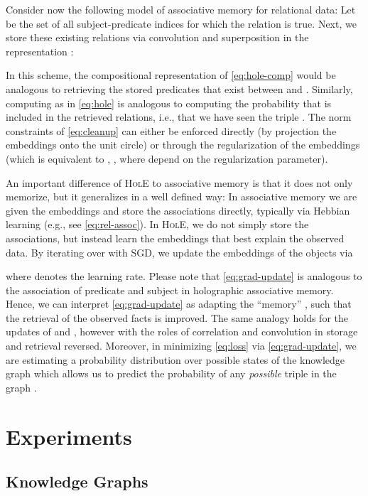 \documentclass[letterpaper]{article}
\newcommand{\hole}{\textsc{HolE}\xspace}
\begin{document}
Consider now the following model of associative memory for relational data:
Let  be the set of all
subject-predicate indices for which the relation  is true. 
Next, we store these existing relations via convolution and superposition
in the representation :

In this scheme, the compositional representation  of \cref{eq:hole-comp}
would be analogous to retrieving the stored predicates  that exist between  and
. Similarly, computing  as in 
\cref{eq:hole} is analogous to computing the probability that  
is included in the retrieved relations, i.e., that we have seen the 
triple . The norm constraints of
\cref{eq:cleanup} can either be enforced directly (by projection the embeddings
onto the unit circle) or through the regularization of the embeddings (which is
equivalent to , , where  depend
on the regularization parameter).


An important difference of \hole to associative memory is that 
it does not only memorize, but it generalizes in a well defined way:
In associative memory we are given the embeddings and store the associations
directly, typically via Hebbian learning (e.g., see \cref{eq:rel-assoc}). 
In \hole, we do not simply store the associations, but instead 
learn the embeddings that best explain the observed data. 
By iterating over  with SGD, we update the
embeddings of the objects via

where  denotes the learning rate.
Please note that \cref{eq:grad-update} is analogous to the association of
predicate and subject in holographic associative memory.
Hence, we can interpret \cref{eq:grad-update} as adapting the ``memory''
, such that the retrieval of the observed facts is improved. The same
analogy holds for the updates of  and , however with the roles of
correlation and convolution in storage and retrieval reversed.
Moreover, in minimizing \cref{eq:loss} via \cref{eq:grad-update}, 
we are estimating a probability distribution over possible states of the
knowledge graph which allows us to predict the probability of any
\emph{possible} triple in the graph \cite{nickel2015review}.


\section{Experiments}

\subsection{Knowledge Graphs}
\label{sec:exp-lp}
\end{document}
